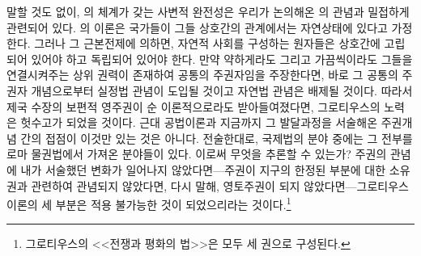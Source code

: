 말할 것도 없이,
의 체계가 갖는 사변적 완전성은 우리가 논의해온
의 관념과 밀접하게 관련되어 있다.
의 이론은 국가들이 그들 상호간의 관계에서는 자연상태에 있다고 가정한다.
그러나
그 근본전제에 의하면,
자연적 사회를 구성하는 원자들은
상호간에 고립되어 있어야 하고
독립되어 있어야 한다.
만약
약하게라도 그리고 가끔씩이라도
그들을 연결시켜주는 상위 권력이 존재하여
공통의 주권자임을 주장한다면,
바로 그 공통의 주권자 개념으로부터 실정법 관념이 도입될 것이고
자연법 관념은 배제될 것이다.
따라서 제국 수장의 보편적 영주권이
순 이론적으로라도 받아들여졌다면, 그로티우스의 노력은 헛수고가 되었을 것이다.
근대 공법이론과 지금까지 그 발달과정을 서술해온 주권개념 간의 접점이
이것만 있는 것은 아니다.
전술한대로, 국제법의 분야 중에는
그 전부를 로마 물권법에서 가져온 분야들이 있다.
이로써 무엇을 추론할 수 있는가?
주권의 관념에 내가 서술했던 변화가 일어나지 않았다면---주권이
지구의 한정된 부분에 대한 소유권과 관련하여 관념되지 않았다면,
다시 말해, 영토주권이 되지 않았다면---그로티우스 이론의 세 부분은
적용 불가능한 것이 되었으리라는 것이다.\footnote{그로티우스의
<<전쟁과 평화의 법>>은 모두 세 권으로 구성된다.}


